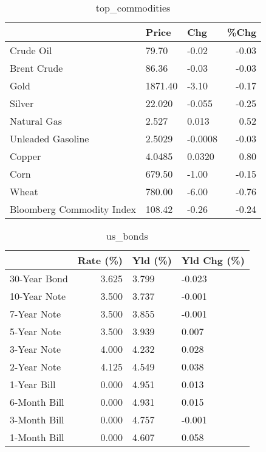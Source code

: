 \documentclass{article}%
\begin{document}
\begin{table}[htbp]%
\caption{top\_commodities}%
\centering%
\begin{adjustbox}{width=1\textwidth}%
\begin{tabular}{lllr}
\toprule
                          &   Price &     Chg &  \%Chg \\
\midrule
               Crude Oil  &   79.70 &   -0.02 & -0.03 \\
             Brent Crude  &   86.36 &   -0.03 & -0.03 \\
                    Gold  & 1871.40 &   -3.10 & -0.17 \\
                  Silver  &  22.020 &  -0.055 & -0.25 \\
             Natural Gas  &   2.527 &   0.013 &  0.52 \\
       Unleaded Gasoline  &  2.5029 & -0.0008 & -0.03 \\
                  Copper  &  4.0485 &  0.0320 &  0.80 \\
                    Corn  &  679.50 &   -1.00 & -0.15 \\
                   Wheat  &  780.00 &   -6.00 & -0.76 \\
Bloomberg Commodity Index &  108.42 &   -0.26 & -0.24 \\
\bottomrule
\end{tabular}
%
\end{adjustbox}%
\end{table}

%


\begin{table}[htbp]%
\caption{us\_bonds}%
\centering%
\begin{adjustbox}{width=1\textwidth}%
\begin{tabular}{lrll}
\toprule
             &  Rate (\%) & Yld (\%) & Yld Chg (\%) \\
\midrule
30-Year Bond &     3.625 &   3.799 &      -0.023 \\
10-Year Note &     3.500 &   3.737 &      -0.001 \\
 7-Year Note &     3.500 &   3.855 &      -0.001 \\
 5-Year Note &     3.500 &   3.939 &       0.007 \\
 3-Year Note &     4.000 &   4.232 &       0.028 \\
 2-Year Note &     4.125 &   4.549 &       0.038 \\
 1-Year Bill &     0.000 &   4.951 &       0.013 \\
6-Month Bill &     0.000 &   4.931 &       0.015 \\
3-Month Bill &     0.000 &   4.757 &      -0.001 \\
1-Month Bill &     0.000 &   4.607 &       0.058 \\
\bottomrule
\end{tabular}
%
\end{adjustbox}%
\end{table}
\end{document}
